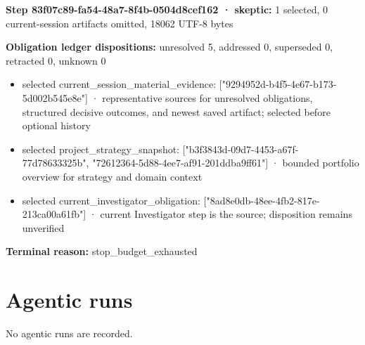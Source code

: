 \documentclass[11pt]{article}
\begin{document}
\textbf{Step 83f07c89-fa54-48a7-8f4b-0504d8cef162 · skeptic:} 1 selected, 0 current-session artifacts omitted, 18062 UTF-8 bytes\par
\textbf{Obligation ledger dispositions:} unresolved 5, addressed 0, superseded 0, retracted 0, unknown 0\par
\begin{itemize}
\item selected current\_session\_material\_evidence: ["9294952d-b4f5-4e67-b173-5d002b545e8e"] · representative sources for unresolved obligations, structured decisive outcomes, and newest saved artifact; selected before optional history
\item selected project\_strategy\_snapshot: ["b3f3843d-09d7-4453-a67f-77d78633325b", "72612364-5d88-4ee7-af91-201ddba9ff61"] · bounded portfolio overview for strategy and domain context
\item selected current\_investigator\_obligation: ["8ad8e0db-48ee-4fb2-817e-213ca00a61fb"] · current Investigator step is the source; disposition remains unverified
\end{itemize}
\textbf{Terminal reason:} stop\_budget\_exhausted\par
\section{Agentic runs}
No agentic runs are recorded.\par
\end{document}
